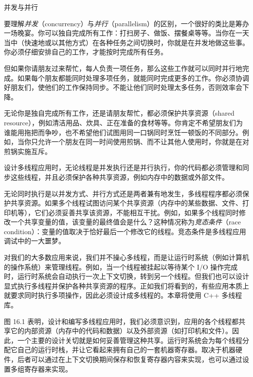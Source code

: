 \begin{mySidebar}{并发与并行}

要理解\emph{并发}（concurrency）与\emph{并行}（parallelism）的区别，一个很好的类比是筹办一场晚宴。你可以独自完成所有工作：打扫房子、做饭、摆餐桌等等。当你在一天当中（快速地或以其他方式）在各种任务之间切换时，你就是在并发地做这些事。你必须仔细安排自己的工作，才能按时完成所有任务。

但如果你请朋友过来帮忙，每人负责一项任务，那么这些工作就可以同时并行地完成。如果每个朋友都能同时处理多项任务，就能同时完成更多的工作。你必须协调好朋友们，使他们的工作保持同步。不能让他们同时处理太多任务，否则效率会下降。

无论你是独自完成所有工作，还是请朋友帮忙，都必须保护共享资源（shared resource），例如清洁用品、炊具、正在准备的食材等等。你肯定不希望朋友们为谁能用拖把而争吵，也不希望他们试图用同一口锅同时烹饪一顿饭的不同部分。例如，当你只允许一个朋友在同一时间使用煎锅、而不让其他人使用时，你就是在对煎锅实施互斥。

设计多线程应用时，无论线程是并发执行还是并行执行，你的代码都必须管理和同步这些线程，并且必须保护各种共享资源，例如内存中的数据或外部文件。
\end{mySidebar}

无论同时执行是以并发方式、并行方式还是两者兼有地发生，多线程程序都必须保护共享资源。如果多个线程试图访问某个共享资源（内存中的某些数据、文件、打印机等），它们必须妥善共享该资源，不能相互干扰。例如，如果多个线程同时修改一个共享变量的值，该变量的最终值会是什么？这种情况称为\emph{竞态条件}（race condition）：变量的值取决于恰好最后一个修改它的线程。竞态条件是多线程应用调试中的一大噩梦。

对我们的大多数应用来说，我们并不操心多线程，而是让运行时系统（例如计算机的操作系统）来管理线程。例如，当一个线程被挂起以等待某个 I/O 操作完成时，运行时系统会自动执行一次上下文切换，转到另一个线程。但我们也可以设计显式执行多线程并保护各种共享资源的程序。正如我们将看到的，有些应用本质上就要求同时执行多项操作，因此必须设计成多线程的。本章将使用 C++ 多线程库。

图 16.1 表明，设计和编写多线程应用时，我们必须意识到，应用的各个线程都共享它的内部资源（内存中的代码和数据）以及外部资源（如打印机和文件）。因此，一个主要的设计关切就是如何妥善管理这种共享。运行时系统会为每个线程分配它自己的运行时栈，并让它看起来拥有自己的一套机器寄存器。取决于机器硬件，后者可以通过在上下文切换期间保存和恢复寄存器内容来实现，也可以通过设置多组寄存器来实现。


